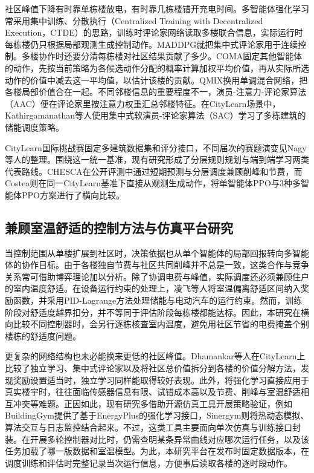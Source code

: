 社区峰值下降有时靠单栋楼放电，有时靠几栋楼错开充电时间。多智能体强化学习常采用集中训练、分散执行（Centralized Training with Decentralized Execution，CTDE）的思路，训练时评论家网络读取多楼联合信息，实际运行时每栋楼仍只根据局部观测生成控制动作\cite{lowe2017}。MADDPG就把集中式评论家用于连续控制。多楼协作时还要分清每栋楼对社区结果贡献了多少。COMA固定其他智能体的动作，先按当前策略为各候选动作分配的概率计算加权平均价值，再从实际所选动作的价值中减去这一平均值，以估计该楼的贡献\cite{foerster2018counterfactual}。QMIX换用单调混合网络，把各楼局部价值合在一起\cite{rashid2018}。不同邻楼信息的重要程度不一，演员-注意力-评论家算法（AAC）便在评论家里按注意力权重汇总邻楼特征\cite{iqbal2019attention}。在CityLearn场景中，Kathirgamanathan等人使用集中式软演员-评论家算法（SAC）学习了多栋建筑的储能调度策略\cite{kathirgamanathan2020}。

CityLearn国际挑战赛固定多建筑数据集和评分接口\cite{citylearnchallenge2023}，不同届次的赛题演变见Nagy等人的整理\cite{nagy2025fouryears}。围绕这一统一基准，现有研究形成了分层规则规划与端到端学习两类代表路线。CHESCA在公开评测中通过短期预测与分层调度兼顾削峰和节费，而Costea则在同一CityLearn基准下直接从观测生成动作，将单智能体PPO与3种多智能体PPO方案进行了横向比较\cite{costea2024}。

\subsection{兼顾室温舒适的控制方法与仿真平台研究}
当控制范围从单楼扩展到社区时，决策依据也从单个智能体的局部回报\cite{zou2020rlsurvey}转向多智能体的协作目标。由于各楼独自节费与社区共同削峰并不总是一致，这类合作与竞争关系常可借助博弈理论加以分析\cite{wang2021magame}。除了协调电费与峰值，实际调度还必须兼顾住户的室内温度舒适。在设备运行约束的处理上，凌飞等人将室温偏离舒适区间纳入奖励函数，并采用PID-Lagrange方法处理储能与电动汽车的运行约束\cite{lingfei2025}。然而，训练阶段对舒适度越界扣分，并不等同于评估阶段每栋楼都能达标。因此，本研究在横向比较不同控制器时，会另行逐栋核查室内温度，避免用社区节省的电费掩盖个别楼栋的舒适度问题。

更复杂的网络结构也未必能换来更低的社区峰值。Dhamankar等人在CityLearn上比较了独立学习、集中式评论家以及将社区总价值拆分到各楼的价值分解方法，发现奖励设置适当时，独立学习同样能取得较好表现\cite{dhamankar2020benchmark}。此外，将强化学习直接应用于真实楼宇时，往往面临传感器信息有限、试错成本高以及节费、削峰与室温舒适相互冲突等难题\cite{nweye2022challenges}。正因如此，现有研究多借助开源仿真工具开展策略验证，例如BuildingGym提供了基于EnergyPlus的强化学习接口\cite{dai2025buildinggym}，Sinergym则将热动态模拟、算法交互与日志监控结合起来\cite{campoy2025sinergym}。不过，这类工具主要面向单次仿真与训练接口封装。在开展多轮控制器对比时，仍需查明某条异常曲线对应哪次运行任务，以及该任务加载了哪一版数据和室温模型。为此，本研究平台在发布时固定数据版本，在调度训练和评估时完整记录当次运行信息，方便事后读取各楼的逐时段动作。

